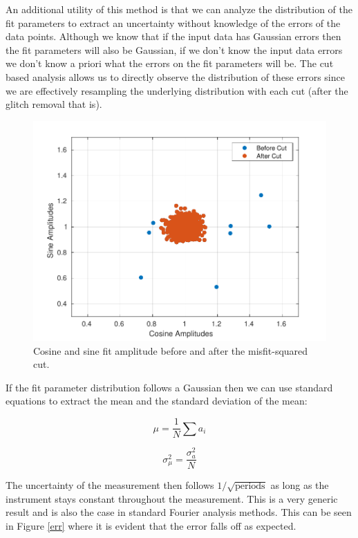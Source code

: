 \documentclass{article}
\begin{document}
An additional utility of this method is that we can analyze the distribution of the fit parameters to extract an uncertainty without knowledge of the errors of the data points. Although we know that if the input data has Gaussian errors then the fit parameters will also be Gaussian, if we don't know the input data errors we don't know a priori what the errors on the fit parameters will be. The cut based analysis allows us to directly observe the distribution of these errors since we are effectively resampling the underlying distribution with each cut (after the glitch removal that is). 


\pagebreak

\begin{figure}[!h]
\begin{centering}
\includegraphics[width=\textwidth]{FitDist.pdf}
\caption{Cosine and sine fit amplitude before and after the misfit-squared cut.}\label{dist}
\end{centering}
\end{figure}

If the fit parameter distribution follows a Gaussian then we can use standard equations to extract the mean and the standard deviation of the mean:

\begin{equation}
\mu =\frac{1}{N} \sum a_i
\end{equation}
 
\begin{equation}
\sigma^2_\mu= \frac{\sigma_a^2 }{N}
\end{equation}

The uncertainty of the measurement then follows $1/\sqrt{\text{periods}}$ as long as the instrument stays constant throughout the measurement. This is a very generic result and is also the case in standard Fourier analysis methods. This can be seen in Figure \ref{err} where it is evident that the error falls off as expected.
\end{document}
